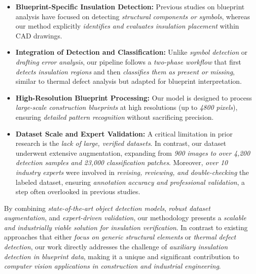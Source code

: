 \begin{itemize}
    \item \textbf{Blueprint-Specific Insulation Detection:} Previous studies on blueprint analysis have focused on detecting \textit{structural components or symbols}, whereas our method explicitly \textit{identifies and evaluates insulation placement} within CAD drawings.  
    \item \textbf{Integration of Detection and Classification:} Unlike \textit{symbol detection} or \textit{drafting error analysis}, our pipeline follows a \textit{two-phase workflow} that first \textit{detects insulation regions} and then \textit{classifies them as present or missing}, similar to thermal defect analysis but adapted for blueprint interpretation.  
    \item \textbf{High-Resolution Blueprint Processing:} Our model is designed to process \textit{large-scale construction blueprints} at high resolutions (up to \textit{4800 pixels}), ensuring \textit{detailed pattern recognition} without sacrificing precision.  
    \item \textbf{Dataset Scale and Expert Validation:} A critical limitation in prior research is the \textit{lack of large, verified datasets}. In contrast, our dataset underwent extensive augmentation, expanding from \textit{900 images to over 4,200 detection samples and 23,000 classification patches}. Moreover, \textit{over 10 industry experts} were involved in \textit{revising, reviewing, and double-checking} the labeled dataset, ensuring \textit{annotation accuracy and professional validation}, a step often overlooked in previous studies.  
\end{itemize}  

By combining \textit{state-of-the-art object detection models}, \textit{robust dataset augmentation}, and \textit{expert-driven validation}, our methodology presents a \textit{scalable and industrially viable solution for insulation verification}. In contrast to existing approaches that either \textit{focus on generic structural elements} or \textit{thermal defect detection}, our work directly addresses the challenge of \textit{auxiliary insulation detection in blueprint data}, making it a unique and significant contribution to \textit{computer vision applications in construction and industrial engineering}.